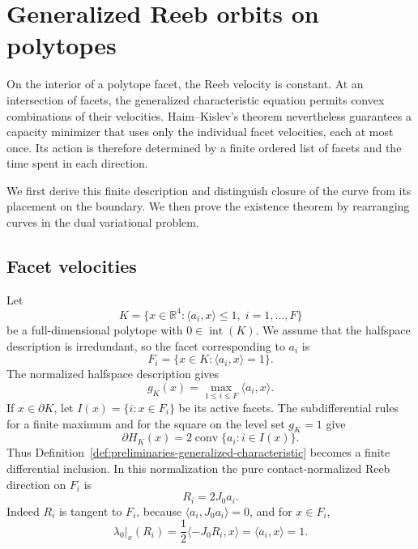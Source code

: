 \section{Generalized Reeb orbits on polytopes}
\label{sec:generalized-reeb-orbits-polytopes}

On the interior of a polytope facet, the Reeb velocity is constant. At an
intersection of facets, the generalized characteristic equation permits
convex combinations of their velocities. Haim--Kislev's theorem nevertheless
guarantees a capacity minimizer that uses only the individual facet
velocities, each at most once. Its action is therefore determined by a finite
ordered list of facets and the time spent in each direction.

We first derive this finite description and distinguish closure of the curve
from its placement on the boundary. We then prove the existence theorem by
rearranging curves in the dual variational problem.


\subsection{Facet velocities}\label{subsec:generalized-reeb-orbits-polytopes-definition}

Let
\[
  K=\{x\in\mathbb{R}^4:\langle a_i,x\rangle\leq 1,\; i=1,\ldots,F\}
\]
be a full-dimensional polytope with \(0\in\operatorname{int}(K)\). We assume
that the halfspace description is irredundant, so the facet corresponding to
\(a_i\) is
\[
  F_i=\{x\in K:\langle a_i,x\rangle=1\}.
\]
The normalized halfspace description gives
\[
  g_K(x)=\max_{1\leq i\leq F}\langle a_i,x\rangle.
\]
If \(x\in\partial K\), let
\(I(x)=\{i:x\in F_i\}\) be its active facets.  The subdifferential rules for a
finite maximum and for the square on the level set \(g_K=1\) give
\begin{equation}\label{eq:generalized-reeb-polytope-subdifferential}
  \partial H_K(x)
  =2\operatorname{conv}\{a_i:i\in I(x)\}.
\end{equation}
Thus Definition~\ref{def:preliminaries-generalized-characteristic} becomes a
finite differential inclusion.  In this normalization the pure
contact-normalized Reeb direction on \(F_i\) is
\begin{equation}\label{eq:generalized-reeb-facet-vector}
  R_i=2J_0a_i.
\end{equation}
Indeed \(R_i\) is tangent to \(F_i\), because
\(\langle a_i,J_0a_i\rangle=0\), and for \(x\in F_i\),
\[
  \lambda_0|_x(R_i)
  =\frac{1}{2}\langle -J_0R_i,x\rangle
  =\langle a_i,x\rangle
  =1.
\]

